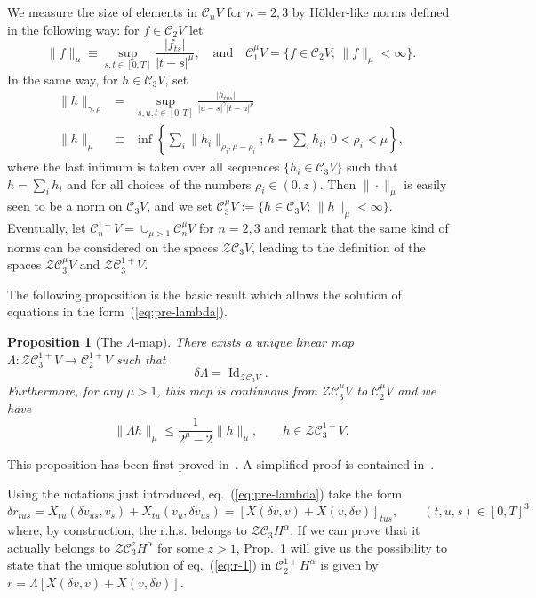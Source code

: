 \documentclass[a4paper,11pt,reqno]{article}
\newcommand{\ott}{[0,T]}
\newcommand{\der}{\delta}
\newcommand{\CC}{\mathcal{C}}
\newcommand{\norm}[1]{\lVert #1\rVert}
\newcommand{\cZ}{\mathcal{Z}}
\DeclareMathOperator{\id}{\text{Id}}
\newtheorem{proposition}[theorem]{Proposition}
\begin{document}
We measure the size of elements in $\CC_n V$ for $n=2,3$  by H\"older-like norms
defined in the following way: for $f \in \CC_2 V $ let
$$
\norm{f}_{\mu} \equiv
\sup_{s,t\in\ott}\frac{|f_{ts}|}{|t-s|^\mu},
\quad\mbox{and}\quad
\CC_1^\mu V =\{ f \in \CC_2 V;\, \norm{f}_{\mu}<\infty  \}.
$$
In the same way, for $h \in \CC_3 V$, set
\begin{eqnarray}
  \label{eq:normOCC2}
  \norm{h}_{\gamma,\rho} &=& \sup_{s,u,t\in\ott} 
\frac{|h_{tus}|}{|u-s|^\gamma |t-u|^\rho}\\
\|h\|_\mu &\equiv &
\inf\left \{\sum_i \|h_i\|_{\rho_i,\mu-\rho_i} ;\, h =
 \sum_i h_i,\, 0 < \rho_i < \mu \right\} ,\nonumber
\end{eqnarray}
where the last infimum is taken over all sequences $\{h_i \in \CC_3 V  \}$ such that $h
= \sum_i h_i$ and for all choices of the numbers $\rho_i \in (0,z)$.
Then  $\|\cdot\|_\mu$ is easily seen to be a norm on $\CC_3 V$, and we set
$
\CC_3^\mu V :=\{ h\in\CC_3 V ;\, \|h\|_\mu<\infty \}
$.
Eventually,
let $\CC_n^{1+} V  = \cup_{\mu > 1} \CC_n^\mu V $ for $n =2,3$
and remark that the same kind of norms can be considered on the
spaces $\cZ \CC_3 V $, leading to the definition of the spaces
$\cZ \CC_3^\mu V $ and $\cZ \CC_3^{1+} V $. 

\vspace{0.3cm}

The following proposition is the basic result which allows the
solution of equations in the form~(\ref{eq:pre-lambda}).

\begin{proposition}[The $\Lambda$-map]
\label{prop:Lambda}
There exists a unique linear map $\Lambda: \cZ \CC^{1+}_3 V 
\to \CC_2^{1+} V $ such that 
$$
\delta \Lambda  = \id_{\cZ \CC_3 V }.
$$
Furthermore, for any $\mu > 1$, 
this map is continuous from $\cZ \CC^{\mu}_3 V $
to $\CC_2^{\mu} V $ and we have
\begin{equation}\label{ineqla}
\|\Lambda h\|_{\mu} \le \frac{1}{2^\mu-2} \|h\|_{\mu} ,\qquad h \in
\cZ \CC^{1+}_3 V . 
\end{equation}
\end{proposition}

This proposition has been first proved in~\cite{MR2091358}. A simplified proof is contained in~\cite{TindelGubinelli}.


\medskip
Using the notations just introduced, eq.~(\ref{eq:pre-lambda}) take
the form
\begin{equation}
  \label{eq:r-1}
\der r_{tus} = X_{tu}(\der v_{us},v_s) + X_{tu}(v_u, \der v_{us}) = [X(\der v,v) + X(v, \der v)]_{tus},
\qquad (t,u,s) \in [0,T]^3  
\end{equation}
where, by construction, the r.h.s. belongs to $\cZ \CC_3 H^\alpha$. If
we can prove that  it actually belongs to $ \cZ \CC^z_3 H^\alpha$
for some $z >1$, Prop.~\ref{prop:Lambda} will give us the possibility to state that the
unique solution of eq.~(\ref{eq:r-1}) in $\CC^{1+}_2 H^\alpha$ is given by
$r = \Lambda [X(\der v,v) + X(v, \der v)]$. 
\end{document}
